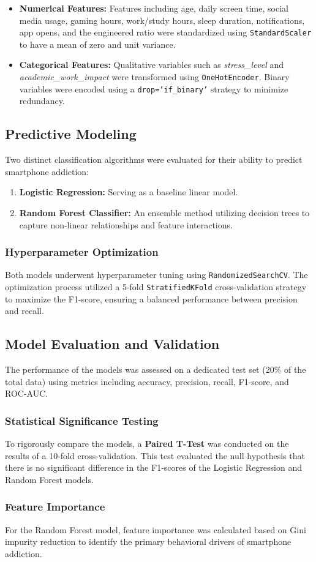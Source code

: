 \begin{itemize}
    \item \textbf{Numerical Features:} Features including age, daily screen time, social media usage, gaming hours, work/study hours, sleep duration, notifications, app opens, and the engineered ratio were standardized using \texttt{StandardScaler} to have a mean of zero and unit variance.
    \item \textbf{Categorical Features:} Qualitative variables such as \textit{stress\_level} and \textit{academic\_work\_impact} were transformed using \texttt{OneHotEncoder}. Binary variables were encoded using a \texttt{drop='if\_binary'} strategy to minimize redundancy.
\end{itemize}

\subsection{Predictive Modeling}
Two distinct classification algorithms were evaluated for their ability to predict smartphone addiction:
\begin{enumerate}
    \item \textbf{Logistic Regression:} Serving as a baseline linear model.
    \item \textbf{Random Forest Classifier:} An ensemble method utilizing decision trees to capture non-linear relationships and feature interactions.
\end{enumerate}

\subsubsection{Hyperparameter Optimization}
Both models underwent hyperparameter tuning using \texttt{RandomizedSearchCV}. The optimization process utilized a 5-fold \texttt{StratifiedKFold} cross-validation strategy to maximize the F1-score, ensuring a balanced performance between precision and recall.

\subsection{Model Evaluation and Validation}
The performance of the models was assessed on a dedicated test set (20\% of the total data) using metrics including accuracy, precision, recall, F1-score, and ROC-AUC.

\subsubsection{Statistical Significance Testing}
To rigorously compare the models, a \textbf{Paired T-Test} was conducted on the results of a 10-fold cross-validation. This test evaluated the null hypothesis that there is no significant difference in the F1-scores of the Logistic Regression and Random Forest models.

\subsubsection{Feature Importance}
For the Random Forest model, feature importance was calculated based on Gini impurity reduction to identify the primary behavioral drivers of smartphone addiction.
